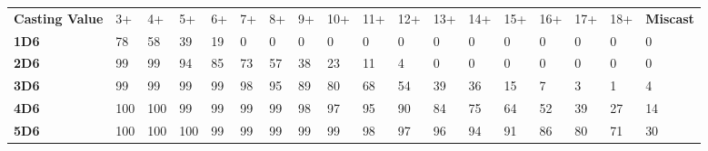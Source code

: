 {
\begin{center}
\setlength{\tabcolsep}{3pt}
\alternaterowcolors\begin{tabular}{M{3cm}*{16}{M{0.58cm}}M{1.5cm}}
\hline
\textbf{Casting Value} & 3+ & 4+ & 5+ & 6+ & 7+ & 8+ & 9+ & 10+ & 11+ & 12+ & 13+ & 14+ & 15+ & 16+ & 17+ & 18+ & \textbf{Miscast} \\
\textbf{1D6} & \num{78} & \num{58} & \num{39} & \num{19} & \num{0} & \num{0} & \num{0} & \num{0} & \num{0} & \num{0} & \num{0} & \num{0} & \num{0} & \num{0} & \num{0} & \num{0} & \num{0} \\
\textbf{2D6} & \num{99} & \num{99} & \num{94} & \num{85} & \num{73} & \num{57} & \num{38} & \num{23} & \num{11} & \num{4} & \num{0} & \num{0} & \num{0} & \num{0} & \num{0} & \num{0} & \num{0} \\
\textbf{3D6} & \num{99} & \num{99} & \num{99} & \num{99} & \num{98} & \num{95} & \num{89} & \num{80} & \num{68} & \num{54} & \num{39} & \num{36} & \num{15} & \num{7} & \num{3} & \num{1} & \num{4} \\
\textbf{4D6} & \num{100} & \num{100} & \num{99} & \num{99} & \num{99} & \num{99} & \num{98} & \num{97} & \num{95} & \num{90} & \num{84} & \num{75} & \num{64} & \num{52} & \num{39} & \num{27} & \num{14} \\
\textbf{5D6} & \num{100} & \num{100} & \num{100} & \num{99} & \num{99} & \num{99} & \num{99} & \num{99} & \num{98} & \num{97} & \num{96} & \num{94} & \num{91} & \num{86} & \num{80} & \num{71} & \num{30} \\
\hline
\end{tabular}
\end{center}
}
\closesummaries

